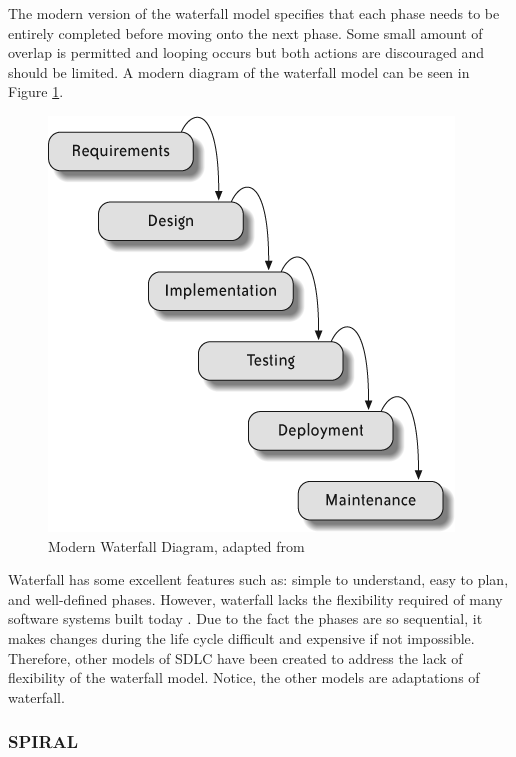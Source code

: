 \documentclass[SDSUThesis.tex]{subfiles}
\begin{document}
        The modern version of the waterfall model specifies that each phase needs 
        to be entirely completed before moving
        onto the next phase.  Some small amount of overlap is permitted and looping 
        occurs but both actions are discouraged and should be limited.  
        A modern diagram of the waterfall model can be seen in Figure \ref{fig:waterfall}.
        \begin{figure}[ht]
            \centering
            \includegraphics[scale=.9]{images/waterfall.png}
            \caption[MODERN WATERFALL]
                {Modern Waterfall Diagram, adapted from \cite{Hibbs2009} }
            \label{fig:waterfall}
        \end{figure}
        
        Waterfall has some excellent features such as: simple to understand,
        easy to plan, and well-defined phases. However, waterfall lacks
        the flexibility required of many software systems built today
        \cite{Maheshwari2012}.  Due to the fact the phases are so sequential,
        it makes changes during the life cycle difficult and expensive if 
        not impossible. Therefore, other models of SDLC have been created
        to address the lack of flexibility of the waterfall model. Notice,
        the other models are  adaptations of waterfall.
    
    
    \subsubsection{SPIRAL}
        
\end{document}
